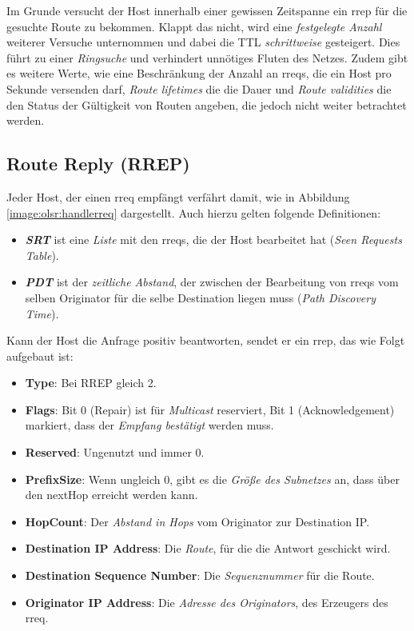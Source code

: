 Im Grunde versucht der Host innerhalb einer gewissen Zeitspanne ein \gls{rrep} für die gesuchte Route zu bekommen. Klappt das nicht, wird eine \textit{festgelegte Anzahl} weiterer Versuche unternommen und dabei die TTL \textit{schrittweise} gesteigert. Dies führt zu einer \textit{Ringsuche} und verhindert unnötiges Fluten des Netzes. Zudem gibt es weitere Werte, wie eine Beschränkung der Anzahl an \glspl{rreq}, die ein Host pro Sekunde versenden darf, \textit{Route lifetimes} die die Dauer und \textit{Route validities} die den Status der Gültigkeit von Routen angeben, die jedoch nicht weiter betrachtet werden.

\subsection{Route Reply (RREP)}
\label{chapter:routing:aodv:funktion:rrep}

Jeder Host, der einen \gls{rreq} empfängt verfährt damit, wie in Abbildung \ref{image:olsr:handlerreq} dargestellt. Auch hierzu gelten folgende Definitionen:

\begin{itemize}
\item \textbf{\textit{SRT}} ist eine \textit{Liste} mit den \glspl{rreq}, die der Host bearbeitet hat (\textit{Seen Requests Table}).
\item \textbf{\textit{PDT}} ist der \textit{zeitliche Abstand}, der zwischen der Bearbeitung von \glspl{rreq} vom selben Originator für die selbe Destination liegen muss (\textit{Path Discovery Time}).
\end{itemize}

Kann der Host die Anfrage positiv beantworten, sendet er ein \gls{rrep}, das wie Folgt aufgebaut ist:

\begin{itemize}
\item \textbf{Type}: Bei RREP gleich 2.
\item \textbf{Flags}: Bit 0 (Repair) ist für \textit{Multicast} reserviert, Bit 1 (Acknowledgement) markiert, dass der \textit{Empfang bestätigt} werden muss.
\item \textbf{Reserved}: Ungenutzt und immer 0.
\item \textbf{PrefixSize}: Wenn ungleich 0, gibt es die \textit{Größe des Subnetzes} an, dass über den nextHop erreicht werden kann.
\item \textbf{HopCount}: Der \textit{Abstand in Hops} vom Originator zur Destination IP.
\item \textbf{Destination IP Address}: Die \textit{Route}, für die die Antwort geschickt wird.
\item \textbf{Destination Sequence Number}: Die \textit{Sequenznummer} für die Route.
\item \textbf{Originator IP Address}: Die \textit{Adresse des Originators}, des Erzeugers des \gls{rreq}.
\end{itemize}

